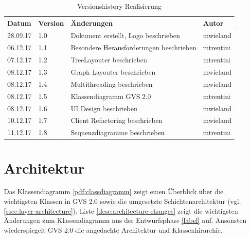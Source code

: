 \documentclass[11pt,a4paper,english,oneside]{book}
\numberwithin{equation}{chapter}
\begin{document}
	\begin{table}[h!]
	\centering
	\begin{tabularx}{\linewidth}{l l X l}
		\toprule 
		Datum & Version & Änderungen & Autor \\
		\midrule
		28.09.17 & 1.0 & Dokument erstellt, Logo beschrieben & mwieland \\
		06.12.17 & 1.1 & Besondere Herausforderungen beschrieben & mtrentini \\
		07.12.17 & 1.2 & TreeLayouter beschrieben & mtrentini \\
		08.12.17 & 1.3 & Graph Layouter beschrieben & mwieland \\
		08.12.17 & 1.4 & Multithreading beschrieben & mwieland \\
		08.12.17 & 1.5 & Klassendiagramm GVS 2.0 & mtrentini \\
		08.12.17 & 1.6 & UI Design beschrieben & mwieland \\
		10.12.17 & 1.7 & Client Refactoring beschrieben & mwieland \\
		11.12.17 & 1.8 & Sequenzdiagramme beschrieben & mtrentini \\
		\bottomrule 
	\end{tabularx} 
	\caption{Versionshistory Realisierung} 
	\end{table}

	\section{Architektur}
	Das Klassendiagramm \ref{pdf:classdiagramm} zeigt einen Überblick über die wichtigsten Klassen in GVS 2.0 sowie die umgesetzte Schichtenarchitektur (vgl. \ref{ssec:layer-architecture}). Liste \ref{desc:architecture-changes} zeigt die wichtigsten Änderungen zum Klassendiagramm aus der Entwurfsphase \ref{label} auf. Ansonsten wiederspiegelt GVS 2.0 die angedachte Architektur und Klassenhirarchie.
	
\end{document}
